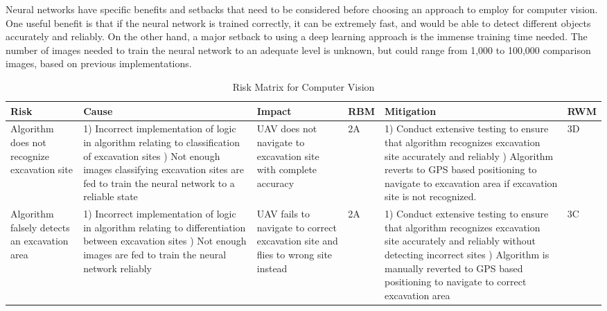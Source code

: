 			Neural networks have specific benefits and setbacks that need to be considered before choosing an approach to employ for computer vision. One useful benefit is that if the neural network is trained correctly, it can be extremely fast, and would be able to detect different objects accurately and reliably. On the other hand, a major setback to using a deep learning approach is the immense training time needed. The number of images needed to train the neural network to an adequate level is unknown, but could range from 1,000 to 100,000 comparison images, based on previous implementations.

 \begin{table}[]
                \label{computer vision}
                {\footnotesize
                \caption{Risk Matrix for Computer Vision}
                \centering
                \begin{tabularx}{\linewidth}{XXXlXl}
                \toprule
                \textbf{Risk}                                            & \textbf{Cause}                                                                                                                 & \textbf{Impact}                                                                                                                           & \textbf{RBM}  & \textbf{Mitigation}                                                                                                                                                                                     & \textbf{RWM} \\
                \midrule
                Algorithm does not recognize excavation site & 1) Incorrect implementation of logic in algorithm relating to classification of excavation sites \newline 2) Not enough images classifying excavation sites are fed to train the neural network to a reliable state & UAV does not navigate to excavation site with complete accuracy & \cellcolor{red!25} 2A & 1) Conduct extensive testing to ensure that algorithm recognizes excavation site accurately and reliably \newline 2) Algorithm reverts to GPS based positioning to navigate to excavation area if excavation site is not recognized. & \cellcolor{green!25} 3D \\
                Algorithm falsely detects an excavation area & 1) Incorrect implementation of logic in algorithm relating to differentiation between excavation sites \newline 2) Not enough images are fed to train the neural network reliably & UAV fails to navigate to correct excavation site and flies to wrong site instead & \cellcolor{red!25} 2A & 1) Conduct extensive testing to ensure that algorithm recognizes excavation site accurately and reliably without detecting incorrect sites \newline 2) Algorithm is manually reverted to GPS based positioning to navigate to correct excavation area & \cellcolor{orange!25} 3C \\

\end{tabularx}}
\end{table}
